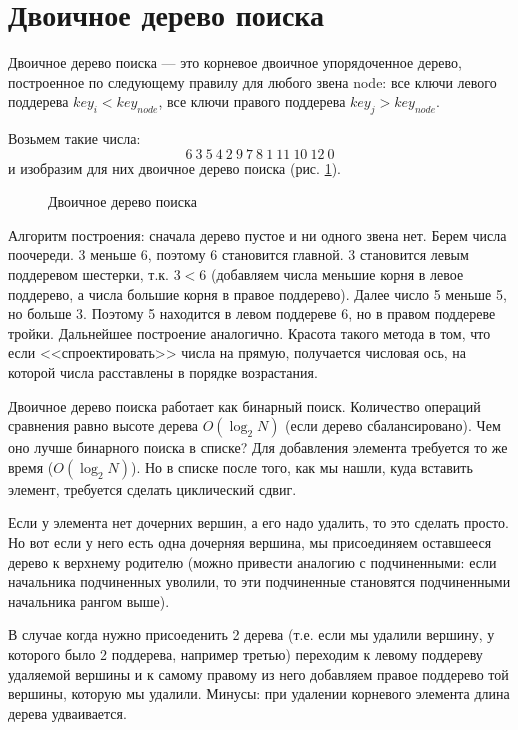 \documentclass[a4paper,12pt]{article}
\theoremstyle{plain} %
\theoremstyle{definition} %
\theoremstyle{remark} %
\begin{document}
\section{Двоичное дерево поиска}
\textsf{Двоичное дерево поиска} --- это корневое двоичное упорядоченное дерево, построенное по следующему правилу для любого звена node: все ключи левого поддерева $key_i<key_{node}$, все ключи правого поддерева $key_j>key_{node}$.

Возьмем такие числа:
$$
6\ 3\ 5\ 4\ 2\ 9\ 7\ 8\ 1\ 11\ 10\ 12\ 0
$$
и изобразим для них двоичное дерево поиска (рис. \ref{fig_dvderevo}).

\begin{figure}
	\centering
	\def\svgwidth{18cm} %
	
	\caption{Двоичное дерево поиска}
	\label{fig_dvderevo}
\end{figure}

Алгоритм построения: сначала дерево пустое и ни одного звена нет. Берем числа поочереди. 3 меньше 6, поэтому 6 становится главной. 3 становится левым поддеревом шестерки, т.к. $3<6$ (добавляем числа меньшие корня в левое поддерево, а числа большие корня в правое поддерево). Далее число 5 меньше 5, но больше 3. Поэтому 5 находится в левом поддереве 6, но в правом поддереве тройки. Дальнейшее построение аналогично. Красота такого метода в том, что если <<спроектировать>> числа на прямую, получается числовая ось, на которой числа расставлены в порядке возрастания.

Двоичное дерево поиска работает как бинарный поиск. Количество операций сравнения равно высоте дерева $O(\log_2N)$ (если дерево сбалансировано). Чем оно лучше бинарного поиска в списке? Для добавления элемента требуется то же время ($O(\log_2N)$). Но в списке после того, как мы нашли, куда вставить элемент, требуется сделать циклический сдвиг.

Если у элемента нет дочерних вершин, а его надо удалить, то это сделать просто. Но вот если у него есть одна дочерняя вершина, мы присоединяем оставшееся дерево к верхнему родителю (можно привести аналогию с подчиненными: если начальника подчиненных уволили, то эти подчиненные становятся подчиненными начальника рангом выше).

В случае когда нужно присоеденить 2 дерева (т.е. если мы удалили вершину, у которого было 2 поддерева, например третью) переходим к левому поддереву удаляемой вершины и к самому правому из него добавляем правое поддерево той вершины, которую мы удалили. Минусы: при удалении корневого элемента длина дерева удваивается.
\end{document}
